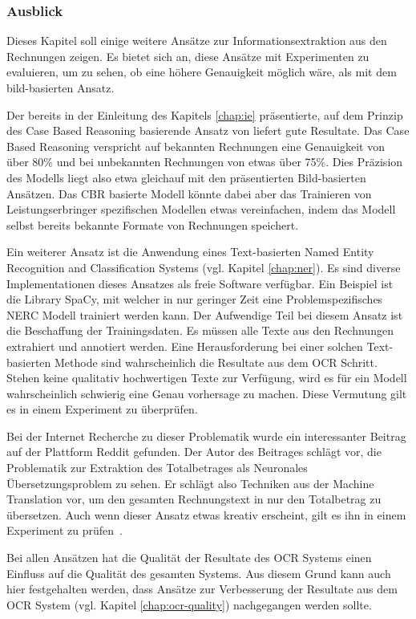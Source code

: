 \subsubsection{Ausblick}

Dieses Kapitel soll einige weitere Ansätze zur Informationsextraktion aus den Rechnungen zeigen. Es bietet sich an, diese Ansätze mit Experimenten zu evaluieren, um zu sehen, ob eine höhere Genauigkeit möglich wäre, als mit dem bild-basierten Ansatz.

Der bereits in der Einleitung des Kapitels \ref{chap:ie} präsentierte, auf dem Prinzip des Case Based Reasoning basierende Ansatz von \textcite{Hamza} liefert gute Resultate. Das Case Based Reasoning verspricht auf bekannten Rechnungen eine Genauigkeit von über 80\% und bei unbekannten Rechnungen von etwas über 75\%. Dies Präzision des Modells liegt also etwa gleichauf mit den präsentierten Bild-basierten Ansätzen. Das CBR basierte Modell könnte dabei aber das Trainieren von Leistungserbringer spezifischen Modellen etwas vereinfachen, indem das Modell selbst bereits bekannte Formate von Rechnungen speichert.

Ein weiterer Ansatz ist die Anwendung eines Text-basierten Named Entity Recognition and Classification Systems (vgl. Kapitel \ref{chap:ner}). Es sind diverse Implementationen dieses Ansatzes als freie Software verfügbar. Ein Beispiel ist die Library SpaCy, mit welcher in nur geringer Zeit eine Problemspezifisches NERC Modell trainiert werden kann. Der Aufwendige Teil bei diesem Ansatz ist die Beschaffung der Trainingsdaten. Es müssen alle Texte aus den Rechnungen extrahiert und annotiert werden. Eine Herausforderung bei einer solchen Text-basierten Methode sind wahrscheinlich die Resultate aus dem OCR Schritt. Stehen keine qualitativ hochwertigen Texte zur Verfügung, wird es für ein Modell wahrscheinlich schwierig eine Genau vorhersage zu machen. Diese Vermutung gilt es in einem Experiment zu überprüfen.

Bei der Internet Recherche zu dieser Problematik wurde ein interessanter Beitrag auf der Plattform Reddit gefunden. Der Autor des Beitrages schlägt vor, die Problematik zur Extraktion des Totalbetrages als Neuronales Übersetzungsproblem zu sehen. Er schlägt also Techniken aus der Machine Translation vor, um den gesamten Rechnungstext in nur den Totalbetrag zu übersetzen. Auch wenn dieser Ansatz etwas kreativ erscheint, gilt es ihn in einem Experiment zu prüfen~\autocite{RedditIE}.

Bei allen Ansätzen hat die Qualität der Resultate des OCR Systems einen Einfluss auf die Qualität des gesamten Systems. Aus diesem Grund kann auch hier festgehalten werden, dass Ansätze zur Verbesserung der Resultate aus dem OCR System (vgl. Kapitel \ref{chap:ocr-quality}) nachgegangen werden sollte.

